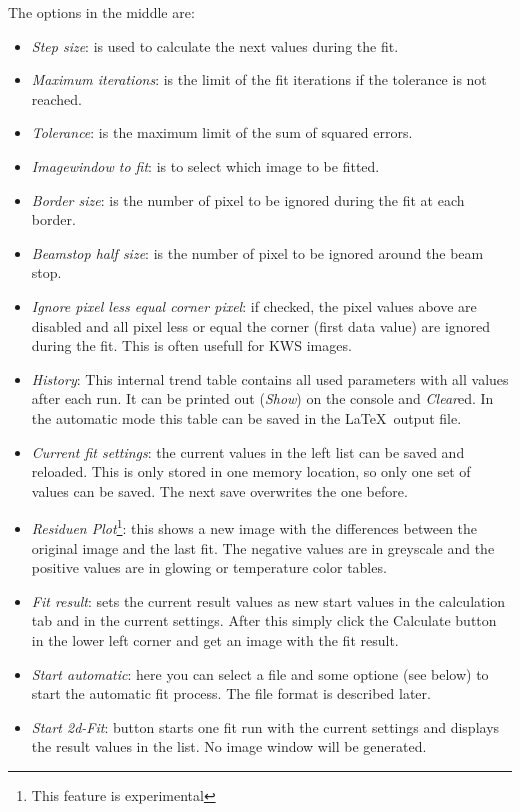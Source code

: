 \documentclass[11pt]{article} %
\begin{document}
The options in the middle are:
\begin{itemize}\itemsep0pt
\item {\it Step size}: is used to calculate the next values during the fit.
\item {\it Maximum iterations}: is the limit of the fit iterations if the tolerance is not reached.
\item {\it Tolerance}: is the maximum limit of the sum of squared errors.
\item {\it Imagewindow to fit}: is to select which image to be fitted.
\item {\it Border size}: is the number of pixel to be ignored during the fit at each border.
\item {\it Beamstop half size}: is the number of pixel to be ignored around the beam stop.
\item {\it Ignore pixel less equal corner pixel}: if checked, the pixel values above are disabled and all pixel less or equal the corner (first data value) are ignored during the fit. This is often usefull for KWS images.
\item {\it History}: This internal trend table contains all used parameters with all values after each run. It can be printed out ({\it Show}) on the console and {\it Clear}ed. In the automatic mode this table can be saved in the \LaTeX\ output file.
\item {\it Current fit settings}: the current values in the left list can be saved and reloaded. This is only stored in one memory location, so only one set of values can be saved. The next save overwrites the one before.
\item {\it Residuen Plot}\footnote{This feature is experimental}: this shows a new image with the differences between the original image and the last fit. The negative values are in greyscale and the positive values are in glowing or temperature color tables.
\item {\it Fit result}: sets the current result values as new start values in the calculation tab and in the current settings. After this simply click the Calculate button in the lower left corner and get an image with the fit result.
\item {\it Start automatic}: here you can select a file and some optione (see below) to start the automatic fit process. The file format is described later.
\item {\it Start 2d-Fit}: button starts one fit run with the current settings and displays the result values in the list. No image window will be generated.
\end{itemize}
\end{document}

